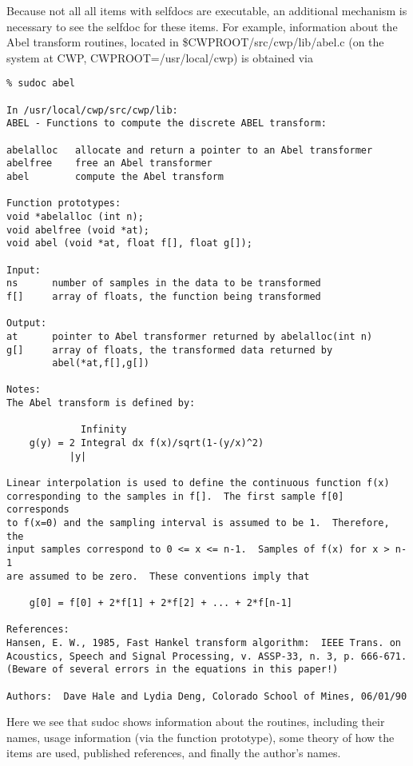 {{Because not all all items with selfdocs are executable, an additional
mechanism is necessary to see the selfdoc for these items.
For example, information about the Abel transform routines, located in
\$CWPROOT/src/cwp/lib/abel.c (on the system at CWP,
 CWPROOT=/usr/local/cwp) is obtained via

{\small\begin{verbatim}
% sudoc abel

In /usr/local/cwp/src/cwp/lib: 
ABEL - Functions to compute the discrete ABEL transform:

abelalloc	allocate and return a pointer to an Abel transformer
abelfree 	free an Abel transformer
abel		compute the Abel transform

Function prototypes:
void *abelalloc (int n);
void abelfree (void *at);
void abel (void *at, float f[], float g[]);

Input:
ns		number of samples in the data to be transformed
f[]		array of floats, the function being transformed

Output:
at		pointer to Abel transformer returned by abelalloc(int n)
g[]		array of floats, the transformed data returned by 
		abel(*at,f[],g[])

Notes:
The Abel transform is defined by:

	         Infinity
	g(y) = 2 Integral dx f(x)/sqrt(1-(y/x)^2)
		   |y|

Linear interpolation is used to define the continuous function f(x)
corresponding to the samples in f[].  The first sample f[0] corresponds
to f(x=0) and the sampling interval is assumed to be 1.  Therefore, the
input samples correspond to 0 <= x <= n-1.  Samples of f(x) for x > n-1
are assumed to be zero.  These conventions imply that 

	g[0] = f[0] + 2*f[1] + 2*f[2] + ... + 2*f[n-1]

References:
Hansen, E. W., 1985, Fast Hankel transform algorithm:  IEEE Trans. on
Acoustics, Speech and Signal Processing, v. ASSP-33, n. 3, p. 666-671.
(Beware of several errors in the equations in this paper!)

Authors:  Dave Hale and Lydia Deng, Colorado School of Mines, 06/01/90
\end{verbatim}}\noindent

Here we see that sudoc 
shows information about the routines, including their names, usage
information (via the function prototype), some theory of how the
items are used, published references, and finally the author's names.

}}
